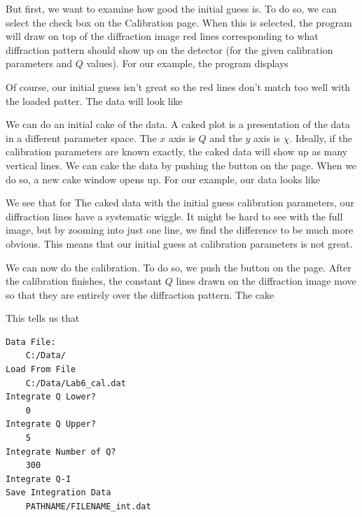 But first, we want to examine how good the initial guess 
is. To do so, we can select the 
check box on the Calibration page. When this is selected, 
the program will draw
on top of the diffraction image red lines corresponding
to what diffraction pattern should show up on the
detector (for the given calibration parameters and $Q$
values). For our example, the program displays


Of course, our initial guess isn't
great so the red lines don't match too well with
the loaded patter. The data will look like

We can do an initial cake of the data. A caked plot
is a presentation of the data in a different parameter 
space.  The $x$ axis is $Q$ and the $y$ axis is $\chi$. 
Ideally, if the calibration parameters are known exactly, 
the caked data will show up as many vertical lines. 
We can cake the data by pushing the 
button on the  page. When we do so, a new cake 
window opens up. For our example, our data looks like

We see that for The caked data with the initial guess 
calibration parameters, our diffraction lines
have a systematic wiggle. It might be hard to see 
with the full image, but by zooming into just one
line, we find the difference to be much more obvious.
This means that our initial guess at 
calibration parameters is not great.

We can now do the calibration. To do so, we push
the  button on the 
page. After the calibration finishes, the constant
$Q$ lines drawn on the diffraction image move
so that they are entirely over the diffraction 
pattern. The cake 

This tells us that 


\begin{lstlisting}[caption={'A macro to automate the 
    analysis'}]
Data File:
	C:/Data/
Load From File
    C:/Data/Lab6_cal.dat
Integrate Q Lower?
	0
Integrate Q Upper?
	5
Integrate Number of Q?
	300
Integrate Q-I
Save Integration Data
    PATHNAME/FILENAME_int.dat
\end{lstlisting}

